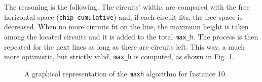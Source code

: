 \documentclass[a4paper, 12pt]{article}
\begin{document}
The reasoning is the following. The circuits' widths are compared with the free horizontal space (\verb+chip_cumulative+) and, if each circuit fits, the free space is decreased. When no more circuits fit on the line, the maximum height is taken among the located circuits and it is added to the total \verb|max_h|. The process is then repeated for the next lines as long as there are circuits left. This way, a much more optimistic, but strictly valid, \verb|max_h| is computed, as shown in Fig. \ref{fig:max_h}.

\begin{figure}
    \centering
        \caption[A graphical representation of the \texttt{maxh} algorithm.]{A graphical representation of the \texttt{maxh} algorithm for Instance 10.}
    \label{fig:max_h}  
\end{figure}


\clearpage
\end{document}
